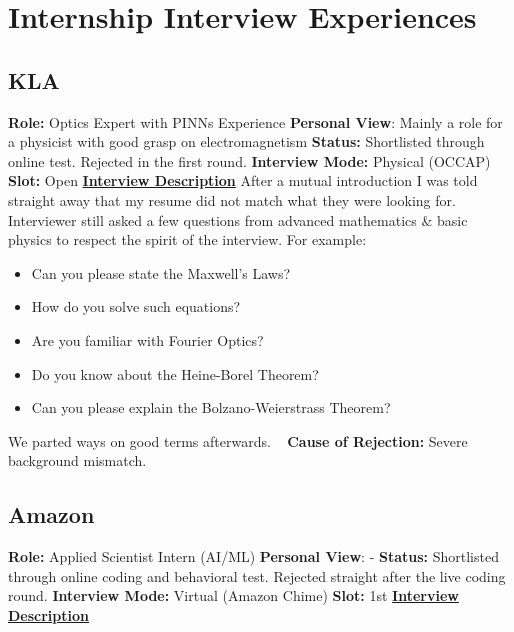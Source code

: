 \documentclass[12pt]{article}
\begin{document}
\section{Internship Interview Experiences}

\subsection{KLA}
\textbf{Role:} Optics Expert with PINNs Experience
\newline
\textbf{Personal View}: Mainly a role for a physicist with good grasp on electromagnetism
\newline
\textbf{Status:} Shortlisted through online test. Rejected in the first round.
\newline
\textbf{Interview Mode:} Physical (OCCAP)
\newline
\textbf{Slot:} Open
\vspace{10pt}
\newline
\underline{\textbf{Interview Description}}
\newline
\newline
After a mutual introduction I was told straight away that my resume did not match what they were looking for. Interviewer still asked a few questions from advanced mathematics \& basic physics to respect the spirit of the interview. For example:

\begin{itemize}
    \item Can you please state the Maxwell's Laws?
    \item How do you solve such equations?
    \item Are you familiar with Fourier Optics?
    \item Do you know about the Heine-Borel Theorem?
    \item Can you please explain the Bolzano-Weierstrass Theorem?
\end{itemize}

We parted ways on good terms afterwards.
\newline
\vspace{1pt}\
\newline
\textbf{Cause of Rejection:} Severe background mismatch.



\subsection{Amazon}

\textbf{Role:} Applied Scientist Intern (AI/ML)
\newline
\textbf{Personal View}: -
\newline
\textbf{Status:} Shortlisted through online coding and behavioral test. Rejected straight after the live coding round.
\newline
\textbf{Interview Mode:} Virtual (Amazon Chime)
\newline
\textbf{Slot:} 1st
\newline
\vspace{10pt}
\newline
\underline{\textbf{Interview Description}}
\newline
\end{document}
